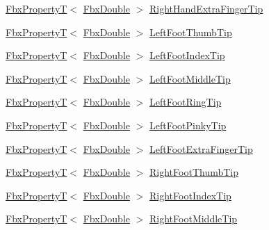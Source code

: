 \begin{DoxyCompactItemize}
\item 
\hyperlink{class_fbx_property_t}{Fbx\+PropertyT}$<$ \hyperlink{fbxtypes_8h_a171e72a1c46fc15c1a6c9c31948c1c5b}{Fbx\+Double} $>$ \hyperlink{class_fbx_character_aac0b926d798f6d825aa3b00aa34001ba}{Right\+Hand\+Extra\+Finger\+Tip}
\item 
\hyperlink{class_fbx_property_t}{Fbx\+PropertyT}$<$ \hyperlink{fbxtypes_8h_a171e72a1c46fc15c1a6c9c31948c1c5b}{Fbx\+Double} $>$ \hyperlink{class_fbx_character_ad56eeb80f6f586d1c4f209b9269a8974}{Left\+Foot\+Thumb\+Tip}
\item 
\hyperlink{class_fbx_property_t}{Fbx\+PropertyT}$<$ \hyperlink{fbxtypes_8h_a171e72a1c46fc15c1a6c9c31948c1c5b}{Fbx\+Double} $>$ \hyperlink{class_fbx_character_aa6e084ea66b64dc56e1c1fe9c02623c5}{Left\+Foot\+Index\+Tip}
\item 
\hyperlink{class_fbx_property_t}{Fbx\+PropertyT}$<$ \hyperlink{fbxtypes_8h_a171e72a1c46fc15c1a6c9c31948c1c5b}{Fbx\+Double} $>$ \hyperlink{class_fbx_character_ab17d6be58ceb88b575305663a5e37b3d}{Left\+Foot\+Middle\+Tip}
\item 
\hyperlink{class_fbx_property_t}{Fbx\+PropertyT}$<$ \hyperlink{fbxtypes_8h_a171e72a1c46fc15c1a6c9c31948c1c5b}{Fbx\+Double} $>$ \hyperlink{class_fbx_character_a713205fb2db938b34a01b78bed306bf0}{Left\+Foot\+Ring\+Tip}
\item 
\hyperlink{class_fbx_property_t}{Fbx\+PropertyT}$<$ \hyperlink{fbxtypes_8h_a171e72a1c46fc15c1a6c9c31948c1c5b}{Fbx\+Double} $>$ \hyperlink{class_fbx_character_ab6770f15c802efcd4b85d89b1b6464be}{Left\+Foot\+Pinky\+Tip}
\item 
\hyperlink{class_fbx_property_t}{Fbx\+PropertyT}$<$ \hyperlink{fbxtypes_8h_a171e72a1c46fc15c1a6c9c31948c1c5b}{Fbx\+Double} $>$ \hyperlink{class_fbx_character_a70d4aa45dea8298f6d183758e3455d66}{Left\+Foot\+Extra\+Finger\+Tip}
\item 
\hyperlink{class_fbx_property_t}{Fbx\+PropertyT}$<$ \hyperlink{fbxtypes_8h_a171e72a1c46fc15c1a6c9c31948c1c5b}{Fbx\+Double} $>$ \hyperlink{class_fbx_character_a6d1844c38937805923d4a83d6aaa8012}{Right\+Foot\+Thumb\+Tip}
\item 
\hyperlink{class_fbx_property_t}{Fbx\+PropertyT}$<$ \hyperlink{fbxtypes_8h_a171e72a1c46fc15c1a6c9c31948c1c5b}{Fbx\+Double} $>$ \hyperlink{class_fbx_character_a174b601c330f92ed0bf0e5e321ec48ad}{Right\+Foot\+Index\+Tip}
\item 
\hyperlink{class_fbx_property_t}{Fbx\+PropertyT}$<$ \hyperlink{fbxtypes_8h_a171e72a1c46fc15c1a6c9c31948c1c5b}{Fbx\+Double} $>$ \hyperlink{class_fbx_character_a3804bbcc2d3f2bd87ce7c88cada6618b}{Right\+Foot\+Middle\+Tip}

\end{DoxyCompactItemize}
